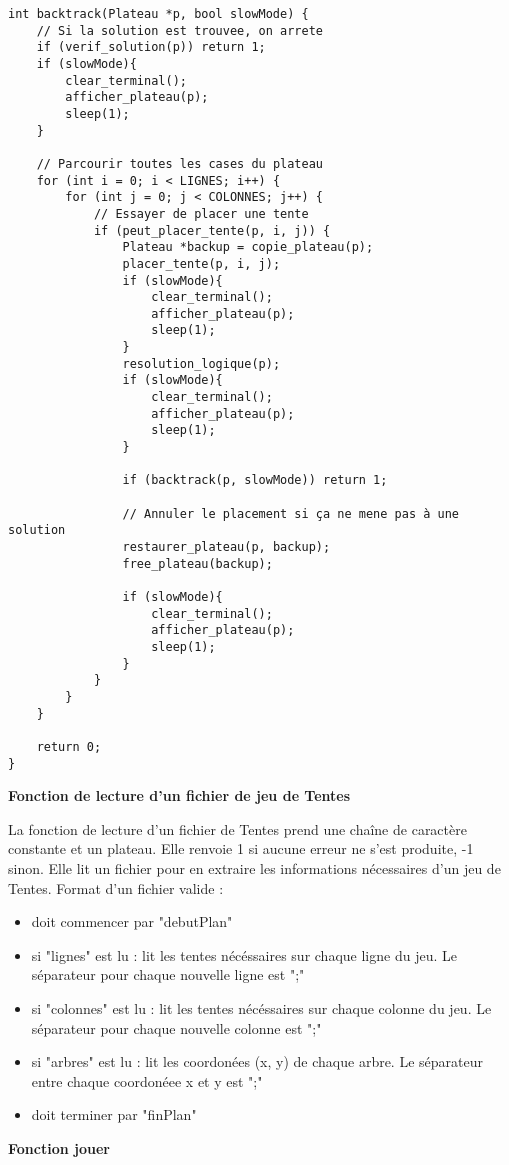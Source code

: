 \documentclass{article}
\begin{document}
\begin{lstlisting}[style=Cstyle]
int backtrack(Plateau *p, bool slowMode) {
    // Si la solution est trouvee, on arrete
    if (verif_solution(p)) return 1;
    if (slowMode){
        clear_terminal();
        afficher_plateau(p);
        sleep(1);
    }

    // Parcourir toutes les cases du plateau
    for (int i = 0; i < LIGNES; i++) {
        for (int j = 0; j < COLONNES; j++) {
            // Essayer de placer une tente
            if (peut_placer_tente(p, i, j)) {
                Plateau *backup = copie_plateau(p);
                placer_tente(p, i, j);
                if (slowMode){
                    clear_terminal();
                    afficher_plateau(p);
                    sleep(1);
                }
                resolution_logique(p);
                if (slowMode){
                    clear_terminal();
                    afficher_plateau(p);
                    sleep(1);
                }

                if (backtrack(p, slowMode)) return 1;

                // Annuler le placement si ça ne mene pas à une solution
                restaurer_plateau(p, backup);
                free_plateau(backup);

                if (slowMode){
                    clear_terminal();
                    afficher_plateau(p);
                    sleep(1);
                }
            }
        }
    }

    return 0;
}
\end{lstlisting}

\textbf{Fonction de lecture d'un fichier de jeu de Tentes}

    La fonction de lecture d'un fichier de Tentes prend une chaîne de caractère constante et un plateau. Elle renvoie 1 si aucune erreur ne s'est produite, -1 sinon.
    Elle lit un fichier pour en extraire les informations nécessaires d'un jeu de Tentes.
    Format d'un fichier valide :
    \begin{itemize}
    \item doit commencer par "debutPlan"
    \item si "lignes" est lu :
        lit les tentes nécéssaires sur chaque ligne du jeu. Le séparateur pour chaque nouvelle ligne est ";"
    \item si "colonnes" est lu :
        lit les tentes nécéssaires sur chaque colonne du jeu. Le séparateur pour chaque nouvelle colonne est ";"
    \item si "arbres" est lu :
        lit les coordonées (x, y) de chaque arbre. Le séparateur entre chaque coordonéee x et y est ";"
    \item doit terminer par "finPlan"
    \end{itemize}
\textbf{Fonction jouer}
\end{document}
